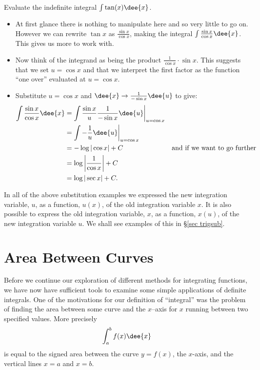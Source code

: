 \begin{eg}\label{eg:substitution9}
Evaluate the indefinite integral $\int \tan(x) \dee{x}$.

\soln
\begin{itemize}
 \item At first glance there is nothing to manipulate here and so very little to go on.
However we can rewrite $\tan x$ as $\frac{\sin x}{\cos x}$, making the integral $\int
\frac{\sin x}{\cos x}\dee{x}$. This gives us more to work with.

\item Now think of the integrand as being the product $\frac{1}{\cos x}\cdot \sin
x$. This suggests that we set $u=\cos x$ and that we interpret the first factor as the
function ``one over'' evaluated at $u=\cos x$.
\item Substitute $u = \cos x$ and $\dee{x} \rightarrow \frac{1}{-\sin x}\dee{u}$ to give:
\begin{align*}
  \int \frac{\sin x}{\cos x}\dee{x}
&=\int \frac{\sin x}{u} \frac{1}{-\sin x} \dee{u} \bigg|_{u=\cos x} \\
&= \int -\frac{1}{u}\dee{u}  \bigg|_{u=\cos x}\\
&= -\log|\cos x| +C & \text{and if we want to go further}\\
&= \log\left|\frac{1}{\cos x} \right|+C\\
&= \log|\sec x| +C.
\end{align*}
\end{itemize}
\end{eg}

In all of the above substitution examples we expressed the new integration 
variable, $u$, as a function, $u(x)$, of the old integration variable $x$. 
It is also possible to express the old integration variable, $x$, as a 
function, $x(u)$, of the new integration variable $u$. We shall see examples 
of this in \S\ref{sec trigsub}. 

\section{Area Between Curves}\label{sec area}
Before we continue our exploration of different methods for integrating functions, we
have now have sufficient tools to examine some simple applications of definite integrals.
One of the motivations for our definition of ``integral'' was the problem of finding
the area between some curve and the $x$--axis for $x$ running between two
specified values. More precisely
\begin{align*}
  \int_a^b f(x) \dee{x}
\end{align*}
is equal to the signed area between the curve $y=f(x)$, the $x$-axis, and the
vertical lines $x=a$ and $x=b$.

